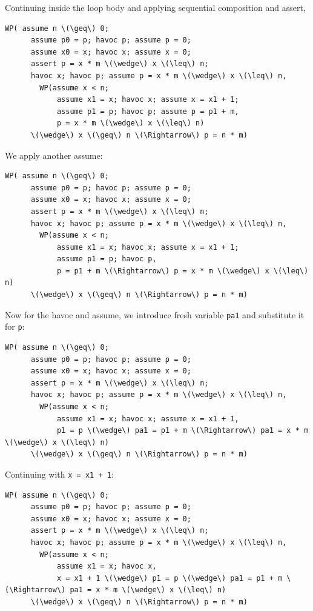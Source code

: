 Continuing inside the loop body and applying sequential composition and \textsf{assert},
\begin{Verbatim}[commandchars=\\\{\}]
  WP( assume n \(\geq\) 0;
      assume p0 = p; havoc p; assume p = 0; 
      assume x0 = x; havoc x; assume x = 0; 
      assert p = x * m \(\wedge\) x \(\leq\) n;
      havoc x; havoc p; assume p = x * m \(\wedge\) x \(\leq\) n,
        WP(assume x < n; 
            assume x1 = x; havoc x; assume x = x1 + 1; 
            assume p1 = p; havoc p; assume p = p1 + m,
            p = x * m \(\wedge\) x \(\leq\) n)
      \(\wedge\) x \(\geq\) n \(\Rightarrow\) p = n * m)
\end{Verbatim}
We apply another \textsf{assume}:
\begin{Verbatim}[commandchars=\\\{\}]
  WP( assume n \(\geq\) 0;
      assume p0 = p; havoc p; assume p = 0; 
      assume x0 = x; havoc x; assume x = 0; 
      assert p = x * m \(\wedge\) x \(\leq\) n;
      havoc x; havoc p; assume p = x * m \(\wedge\) x \(\leq\) n,
        WP(assume x < n; 
            assume x1 = x; havoc x; assume x = x1 + 1; 
            assume p1 = p; havoc p,
            p = p1 + m \(\Rightarrow\) p = x * m \(\wedge\) x \(\leq\) n)
      \(\wedge\) x \(\geq\) n \(\Rightarrow\) p = n * m)
\end{Verbatim}
Now for the \textsf{havoc} and \textsf{assume}, we introduce fresh variable \texttt{pa1} and substitute it for \texttt{p}:
\begin{Verbatim}[commandchars=\\\{\}]
  WP( assume n \(\geq\) 0;
      assume p0 = p; havoc p; assume p = 0; 
      assume x0 = x; havoc x; assume x = 0; 
      assert p = x * m \(\wedge\) x \(\leq\) n;
      havoc x; havoc p; assume p = x * m \(\wedge\) x \(\leq\) n,
        WP(assume x < n; 
            assume x1 = x; havoc x; assume x = x1 + 1,
            p1 = p \(\wedge\) pa1 = p1 + m \(\Rightarrow\) pa1 = x * m \(\wedge\) x \(\leq\) n)
      \(\wedge\) x \(\geq\) n \(\Rightarrow\) p = n * m)
\end{Verbatim}
Continuing with \texttt{x = x1 + 1}:
\begin{Verbatim}[commandchars=\\\{\}]
  WP( assume n \(\geq\) 0;
      assume p0 = p; havoc p; assume p = 0; 
      assume x0 = x; havoc x; assume x = 0; 
      assert p = x * m \(\wedge\) x \(\leq\) n;
      havoc x; havoc p; assume p = x * m \(\wedge\) x \(\leq\) n,
        WP(assume x < n; 
            assume x1 = x; havoc x,
            x = x1 + 1 \(\wedge\) p1 = p \(\wedge\) pa1 = p1 + m \(\Rightarrow\) pa1 = x * m \(\wedge\) x \(\leq\) n)
      \(\wedge\) x \(\geq\) n \(\Rightarrow\) p = n * m)
\end{Verbatim}
